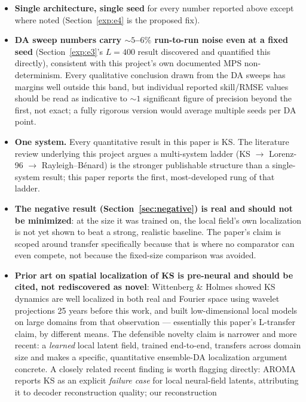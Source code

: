\documentclass[11pt]{article}
\begin{document}
\begin{itemize}[nosep]
\item \textbf{Single architecture, single seed} for every number
  reported above except where noted (Section~\ref{exp:e4} is the
  proposed fix).
\item \textbf{DA sweep numbers carry $\sim5$--$6\%$ run-to-run noise
  even at a fixed seed} (Section~\ref{exp:e3}'s $L=400$ result
  discovered and quantified this directly), consistent with this
  project's own documented MPS non-determinism. Every qualitative
  conclusion drawn from the DA sweeps has margins well outside this
  band, but individual reported skill/RMSE values should be read as
  indicative to $\sim1$ significant figure of precision beyond the
  first, not exact; a fully rigorous version would average multiple
  seeds per DA point.
\item \textbf{One system.} Every quantitative result in this paper is
  KS. The literature review underlying this project argues a
  multi-system ladder (KS $\to$ Lorenz-96 $\to$ Rayleigh--B\'enard) is
  the stronger publishable structure than a single-system result; this
  paper reports the first, most-developed rung of that ladder.
\item \textbf{The negative result (Section~\ref{sec:negative}) is real
  and should not be minimized}: at the size it was trained on, the
  local field's own localization is not yet shown to beat a strong,
  realistic baseline. The paper's claim is scoped around transfer
  specifically because that is where no comparator can even compete,
  not because the fixed-size comparison was avoided.
\item \textbf{Prior art on spatial localization of KS is pre-neural and
  should be cited, not rediscovered as novel}: Wittenberg \& Holmes
  \cite{wittenberg1999} showed KS dynamics are well localized in both
  real and Fourier space using wavelet projections 25 years before this
  work, and built low-dimensional local models on large domains from
  that observation --- essentially this paper's L-transfer claim, by
  different means. The defensible novelty claim is narrower and more
  recent: a \emph{learned} local latent field, trained end-to-end,
  transfers across domain size and makes a specific, quantitative
  ensemble-DA localization argument concrete. A closely related recent
  finding is worth flagging directly: AROMA \cite{aroma2024} reports KS
  as an explicit \emph{failure case} for local neural-field latents,
  attributing it to decoder reconstruction quality; our reconstruction

\end{itemize}
\end{document}
